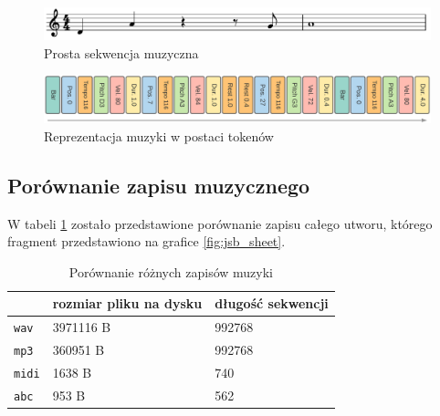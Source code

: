 \documentclass[data-science]{agh-wi} %
\begin{document}
\begin{figure}
    \begin{center}
        \includegraphics[width=0.9\linewidth]{./img/tokenizer_notes.pdf}
    \end{center}
    \caption{Prosta sekwencja muzyczna}\label{fig:remi_notes}
\end{figure}

\begin{figure}
    \begin{center}
        \includegraphics[width=0.9\linewidth]{./img/remi.png}
    \end{center}
    \caption{Reprezentacja muzyki w postaci tokenów}\label{fig:remi_tokens}
\end{figure}

\subsection{Porównanie zapisu muzycznego}
W tabeli \ref*{tab:music_diff} zostało przedstawione porównanie zapisu całego utworu, którego fragment przedstawiono na grafice \ref*{fig:jsb_sheet}.

\begin{table}[ht!]
    \centering
    \begin{tabular}{|l|l|l|}
        \hline
                      & rozmiar pliku na dysku & długość sekwencji \\ \hline
        \texttt{wav}  & 3971116 B              & 992768            \\ \hline
        \texttt{mp3}  & 360951 B               & 992768            \\ \hline
        \texttt{midi} & 1638 B                 & 740               \\ \hline
        \texttt{abc}  & 953 B                  & 562               \\ \hline
    \end{tabular}
    \caption{Porównanie różnych zapisów muzyki}\label{tab:music_diff}
\end{table}
\end{document}
